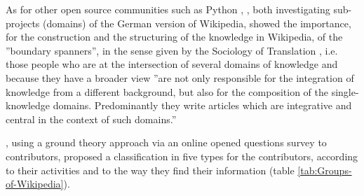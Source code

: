 As for other open source communities such as Python \citep{BarcelliniDetienneBurkhardt08},
\citet{Harreretal08,Halatchliyskietal10}, both investigating sub-projects
(domains) of the German version of Wikipedia, showed the importance,
for the construction and the structuring of the knowledge in Wikipedia,
of the ''boundary spanners'', in the sense given by the Sociology
of Translation \citep{CallonLawRip86,AkrichCallonLatour06}, i.e.
those people who are at the intersection of several domains of knowledge
and because they have a broader view ''are not only responsible for
the integration of knowledge from a different background, but also
for the composition of the single-knowledge domains. Predominantly
they write articles which are integrative and central in the context
of such domains.'' 

\citet{Huvila10}, using a ground theory approach via an online opened
questions survey to contributors, proposed a classification in five
types for the contributors, according to their activities and to the
way they find their information (table \ref{tab:Groups-of-Wikipedia}).

